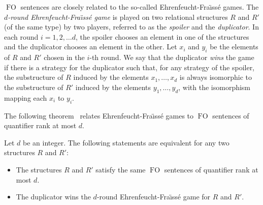 \documentclass{CSML}
\newcommand{\FO}{\ensuremath{\operatorname{FO}}\xspace}
\theoremstyle{plain}\newtheorem{claim}[thm]{Claim}
\begin{document}
\FO sentences are closely related to the so-called Ehrenfeucht-Fra{\"\i}ss\'e games.
The {\em $d$-round Ehrenfeucht-Fra{\"\i}ss\'e game} is played on two relational structures $R$ and $R'$ (of the same type)
by two players, referred to as the {\em spoiler} and the {\em duplicator}. 
In each round $i=1,2,\dots d$,
the spoiler chooses an element in one of the structures and the duplicator chooses an element in the other.
Let $x_i$ and $y_i$ be the elements of $R$ and $R'$ chosen in the $i$-th round.
We say that the duplicator {\em wins} the game if there is a strategy for the duplicator such that, for any strategy of the spoiler, 
the substructure of $R$ induced by the elements $x_1,\ldots,x_d$ is always isomorphic
to the substructure of $R'$ induced by the elements $y_1,\ldots,y_d$, with the isomorphism mapping each $x_i$ to $y_i$.

The following theorem~\cite{ehr61,fra54} relates Ehrenfeucht-Fra{\"\i}ss\'e games to \FO sentences of quantifier rank at most $d$.

\begin{thm}
\label{thm-EF}
Let $d$ be an integer. The following statements are equivalent for any two structures $R$ and $R'$:
\begin{itemize}
\item The structures $R$ and $R'$ satisfy the same \FO sentences of quantifier rank at most $d$.
\item The duplicator wins the $d$-round Ehrenfeucht-Fra{\"\i}ss\'e game for $R$ and $R'$.
\end{itemize}
\end{thm}
\end{document}
